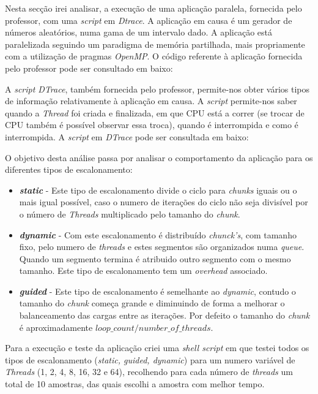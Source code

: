 \documentclass[conference,compsoc]{IEEEtran}
\begin{document}
Nesta secção irei analisar, a execução de uma aplicação paralela, fornecida pelo professor, com uma \textit{script} em \textit{Dtrace}. A aplicação em causa é um gerador de números aleatórios, numa gama de um intervalo dado. A aplicação está paralelizada seguindo um paradigma de memória partilhada, mais propriamente com a utilização de pragmas \textit{OpenMP}. O código referente à aplicação fornecida pelo professor pode ser consultado em baixo:

 

A \textit{script DTrace}, também fornecida pelo professor, permite-nos obter vários tipos de informação relativamente à aplicação em causa. A \textit{script} permite-nos saber quando a \textit{Thread} foi criada e finalizada, em que CPU está a correr (se trocar de CPU também é possível observar essa troca), quando é interrompida e como é interrompida. A \textit{script} em \textit{DTrace} pode ser consultada em baixo:



O objetivo desta análise passa por analisar o comportamento da aplicação para os diferentes tipos de escalonamento:

\begin{itemize}
	\item \textbf{\textit{static}} - Este tipo de escalonamento divide o ciclo para \textit{chunks} iguais ou o mais igual possível, caso o numero de iterações do ciclo não seja divisível por o número de \textit{Threads} multiplicado pelo tamanho do \textit{chunk}.
	\item \textbf{\textit{dynamic}} - Com este escalonamento é distribuído \textit{chunck's}, com tamanho fixo, pelo numero de \textit{threads} e estes segmentos são organizados numa \textit{queue}. Quando um segmento termina é atribuido outro segmento com o mesmo tamanho. Este tipo de escalonamento tem um \textit{overhead} associado.
	\item \textbf{\textit{guided}} - Este tipo de escalonamento é semelhante ao \textit{dynamic}, contudo o tamanho do \textit{chunk} começa grande e diminuindo de forma a melhorar o balanceamento das cargas entre as iterações. Por defeito o tamanho do \textit{chunk} é aproximadamente $loop\_count/number\_of\_threads$.
\end{itemize}

Para a execução e teste da aplicação criei uma \textit{shell script} em que testei todos os tipos de escalonamento (\textit{static, guided, dynamic}) para um numero variável de \textit{Threads} (1, 2, 4, 8, 16, 32 e 64), recolhendo para cada número de \textit{threads} um total de 10 amostras, das quais escolhi a amostra com melhor tempo.
\end{document}
